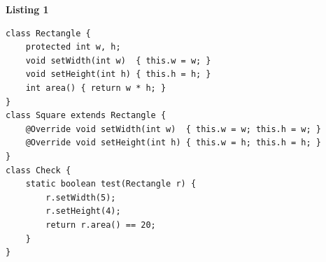 \documentclass[border=10pt]{standalone}
\begin{document}
\pagecolor{paper}\begin{minipage}{15.5cm}\vspace{4pt}
\textbf{\small\color{gray}Listing 1}\par\vspace{2pt}
\lstset{style=sv}
\begin{lstlisting}
class Rectangle {
    protected int w, h;
    void setWidth(int w)  { this.w = w; }
    void setHeight(int h) { this.h = h; }
    int area() { return w * h; }
}
class Square extends Rectangle {
    @Override void setWidth(int w)  { this.w = w; this.h = w; }
    @Override void setHeight(int h) { this.w = h; this.h = h; }
}
class Check {
    static boolean test(Rectangle r) {
        r.setWidth(5);
        r.setHeight(4);
        return r.area() == 20;
    }
}
\end{lstlisting}
\vspace{2pt}\end{minipage}
\end{document}
